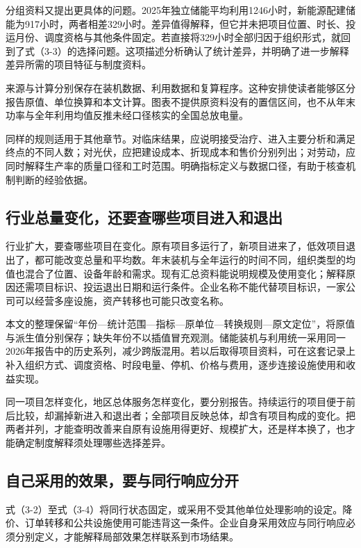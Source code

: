\documentclass[UTF8,fontset=windows,12pt,a4paper,oneside,openany]{ctexbook}
\begin{document}
分组资料又提出更具体的问题。2025年独立储能平均利用1246小时，新能源配建储能为917小时，两者相差329小时。差异值得解释，但它并未把项目位置、时长、投运月份、调度资格与其他条件固定。若直接将329小时全部归因于组织形式，就回到了式（3-3）的选择问题。这项描述分析确认了统计差异，并明确了进一步解释差异所需的项目特征与制度资料。

来源与计算分别保存在装机数据、利用数据和复算程序。这种安排使读者能够区分报告原值、单位换算和本文计算。图表不提供原资料没有的置信区间，也不从年末功率与全年利用均值反推未经口径核实的全国总放电量。

同样的规则适用于其他章节。对临床结果，应说明接受治疗、进入主要分析和满足终点的不同人数；对光伏，应把建设成本、折现成本和售价分别列出；对劳动，应同时解释生产率的质量口径和工时范围。明确指标定义与数据口径，有助于核查机制判断的经验依据。


\subsection{行业总量变化，还要查哪些项目进入和退出}

行业扩大，要查哪些项目在变化。原有项目多运行了，新项目进来了，低效项目退出了，都可能改变总量和平均数。年末装机与全年运行的时间不同，组织类型的均值也混合了位置、设备年龄和需求。现有汇总资料能说明规模及使用变化；解释原因还需项目标识、投运退出日期和运行条件。企业名称不能代替项目标识，一家公司可以经营多座设施，资产转移也可能只改变名称。

本文的整理保留“年份—统计范围—指标—原单位—转换规则—原文定位”，将原值与派生值分别保存；缺失年份不以插值冒充观测。储能装机与利用统一采用同一2026年报告中的历史系列，减少跨版混用。若以后取得项目资料，可在这套记录上补入组织方式、调度资格、时段电量、停机、价格与费用，逐步连接设施使用和收益实现。

同一项目怎样变化，地区总体服务怎样变化，要分别报告。持续运行的项目便于前后比较，却漏掉新进入和退出者；全部项目反映总体，却含有项目构成的变化。把两者并列，才能查明改善来自原有设施用得更好、规模扩大，还是样本换了，也才能确定制度解释须处理哪些选择差异。

\subsection{自己采用的效果，要与同行响应分开}

式（3-2）至式（3-4）将同行状态固定，或采用不受其他单位处理影响的设定。降价、订单转移和公共设施使用可能违背这一条件。企业自身采用效应与同行响应必须分别定义，才能解释局部效果怎样联系到市场结果。
\end{document}
